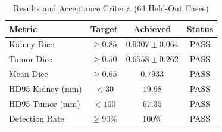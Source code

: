 \begin{table}[!t]
\caption{Results and Acceptance Criteria (64 Held-Out Cases)}
\label{tab:results}
\centering
\begin{tabular}{@{}lccc@{}}
\toprule
\textbf{Metric} & \textbf{Target} & \textbf{Achieved} & \textbf{Status} \\
\midrule
Kidney Dice & $\geq 0.85$ & $0.9307 \pm 0.064$ & PASS \\
Tumor Dice & $\geq 0.50$ & $0.6558 \pm 0.262$ & PASS \\
Mean Dice & $\geq 0.65$ & $0.7933$ & PASS \\
HD95 Kidney (mm) & $< 30$ & $19.98$ & PASS \\
HD95 Tumor (mm) & $< 100$ & $67.35$ & PASS \\
Detection Rate & $\geq 90\%$ & $100\%$ & PASS \\
\bottomrule
\end{tabular}
\end{table}
